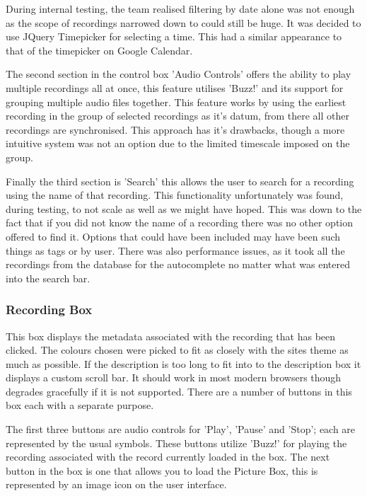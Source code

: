 \documentclass{l3proj}
\begin{document}
During internal testing, the team realised filtering by date alone was not enough as the scope of recordings narrowed down to could still be huge. It was decided to use \gls{JQuery} Timepicker\cite{jQueryTimepicker} for selecting a time. This had a similar appearance to that of the timepicker on Google Calendar\cite{googleCalendar}.

The second section in the control box 'Audio Controls' offers the ability to play multiple recordings all at once, this feature utilises 'Buzz!' and its support for grouping multiple audio files together. This feature works by using the earliest recording in the group of selected recordings as it's datum, from there all other recordings are synchronised. This approach has it's drawbacks, though a more intuitive system was not an option due to the limited timescale imposed on the group.

Finally the third section is 'Search' this allows the user to search for a recording using the name of that recording. This functionality unfortunately was found, during testing, to not scale as well as we might have hoped. This was down to the fact that if you did not know the name of a recording there was no other option offered to find it. Options that could have been included may have been such things as tags or by user. There was also performance issues, as it took all the recordings from the database for the autocomplete no matter what was entered into the search bar.

\subsubsection{Recording Box}

This box displays the metadata associated with the recording that has been clicked. The colours chosen were picked to fit as closely with the sites theme as much as possible. If the description is too long to fit into to the description box it displays a custom  scroll bar. It should work in most modern browsers though degrades gracefully if it is not supported. There are a number of buttons in this box each with a separate purpose.

The first three buttons are audio controls for 'Play', 'Pause' and 'Stop'; each are represented by the usual symbols. These buttons utilize 'Buzz!' for playing the recording associated with the record currently loaded in the box. The next button in the box is one that allows you to load the Picture Box, this is represented by an image icon on the user interface.
\end{document}
